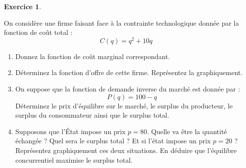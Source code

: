 \documentclass[
]{book}
\providecommand{\tightlist}{%
  \setlength{\itemsep}{0pt}\setlength{\parskip}{0pt}}
\theoremstyle{definition}
\theoremstyle{definition}
\theoremstyle{definition}
\newtheorem{exercise}{Exercice}[chapter]
\theoremstyle{definition}
\theoremstyle{remark}
\begin{document}
\begin{exercise}
\protect\hypertarget{exr:cppexo2}{}\label{exr:cppexo2}

On considère une firme faisant face à la contrainte technologique donnée par la fonction de coût total :
\[C(q)=q^2+10q\]

\begin{enumerate}
\def\labelenumi{\arabic{enumi}.}
\tightlist
\item
  Donnez la fonction de coût marginal correspondant.
\item
  Déterminez la fonction d'offre de cette firme. Représentez la graphiquement.
\item
  On suppose que la fonction de demande inverse du marché est donnée par :
  \[P(q)=100-q\]
  Déterminez le prix d'équilibre sur le marché, le surplus du producteur, le surplus du consommateur ainsi que le surplus total.
\item
  Supposons que l'État impose un prix \(p=80\). Quelle va être la quantité échangée ? Quel sera le surplus total ? Et si l'état impose un prix \(p=20\) ? Représentez graphiquement ces deux situations. En déduire que l'équilibre concurrentiel maximise le surplus total.
\end{enumerate}

\end{exercise}
\end{document}
